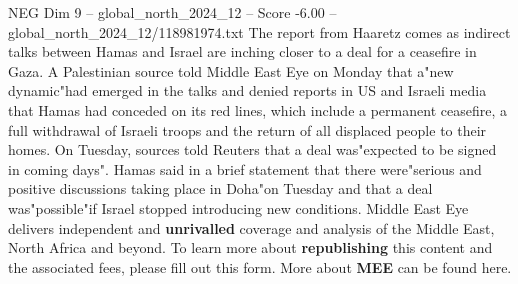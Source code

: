 \begin{textsample}{NEG Dim 9 – global\_north\_2024\_12 – Score -6.00 – global\_north\_2024\_12/118981974.txt}
The report from Haaretz comes as indirect talks between Hamas and Israel are inching closer to a deal for a ceasefire in Gaza.
A Palestinian source told Middle East Eye on Monday that a"new dynamic"had emerged in the talks and denied reports in US and Israeli media that Hamas had conceded on its red lines, which include a permanent ceasefire, a full withdrawal of Israeli troops and the return of all displaced people to their homes.
On Tuesday, sources told Reuters that a deal was"expected to be signed in coming days".
Hamas said in a brief statement that there were"serious and positive discussions taking place in Doha"on Tuesday and that a deal was"possible"if Israel stopped introducing new conditions.
Middle East Eye delivers independent and \textbf{unrivalled} coverage and analysis of the Middle East, North Africa and beyond.
To learn more about \textbf{republishing} this content and the associated fees, please fill out this form.
More about \textbf{MEE} can be found here.

\end{textsample}

